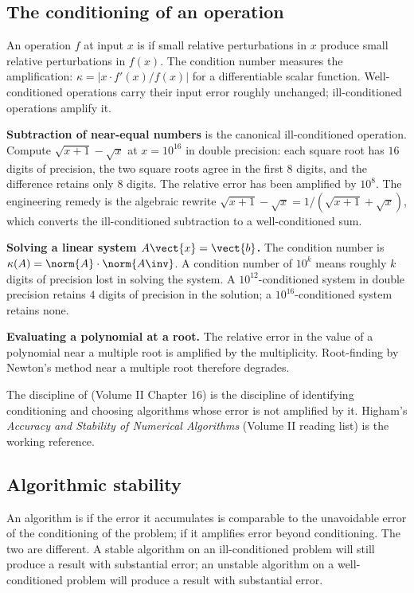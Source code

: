 \subsection{The conditioning of an operation}

An operation $f$ at input $x$ is  if small relative perturbations in $x$ produce small relative perturbations in $f(x)$. The condition number measures the amplification: $\kappa = \left| x \cdot f'(x) / f(x) \right|$ for a differentiable scalar function. Well-conditioned operations carry their input error roughly unchanged; ill-conditioned operations amplify it.

\textbf{Subtraction of near-equal numbers} is the canonical ill-conditioned operation. Compute $\sqrt{x + 1} - \sqrt{x}$ at $x = 10^{16}$ in double precision: each square root has $16$ digits of precision, the two square roots agree in the first $8$ digits, and the difference retains only $8$ digits. The relative error has been amplified by $10^8$. The engineering remedy is the algebraic rewrite $\sqrt{x + 1} - \sqrt{x} = 1 / (\sqrt{x + 1} + \sqrt{x})$, which converts the ill-conditioned subtraction to a well-conditioned sum.

\textbf{Solving a linear system $A \vect{x} = \vect{b}$.} The condition number is $\kappa(A) = \norm{A} \cdot \norm{A\inv}$. A condition number of $10^k$ means roughly $k$ digits of precision lost in solving the system. A $10^{12}$-conditioned system in double precision retains $4$ digits of precision in the solution; a $10^{16}$-conditioned system retains none.

\textbf{Evaluating a polynomial at a root.} The relative error in the value of a polynomial near a multiple root is amplified by the multiplicity. Root-finding by Newton's method near a multiple root therefore degrades.

The discipline of  (Volume II Chapter 16) is the discipline of identifying conditioning and choosing algorithms whose error is not amplified by it. Higham's \emph{Accuracy and Stability of Numerical Algorithms} (Volume II reading list) is the working reference.

\subsection{Algorithmic stability}

An algorithm is  if the error it accumulates is comparable to the unavoidable error of the conditioning of the problem;  if it amplifies error beyond conditioning. The two are different. A stable algorithm on an ill-conditioned problem will still produce a result with substantial error; an unstable algorithm on a well-conditioned problem will produce a result with substantial error.

